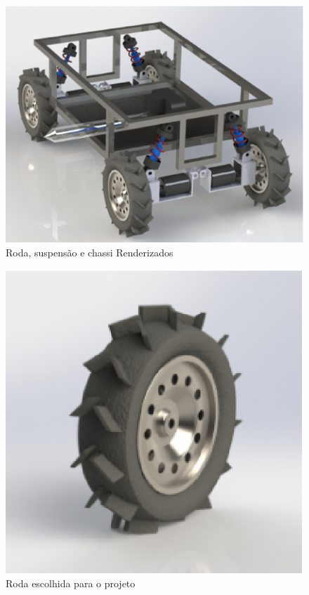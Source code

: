   \begin{figure}[!htbp]
  \begin{center}
  \includegraphics[keepaspectratio=true,scale=0.5]{figuras/suspention02.eps}
  \caption{\label{SUSPENTION02}Roda, suspensão e chassi Renderizados}
  \end{center}
  \end{figure}

  \begin{figure}[!htbp]
  \begin{center}
  \includegraphics[keepaspectratio=true,scale=0.8]{figuras/wheel.eps}
  \caption{\label{WHEEL}Roda escolhida para o projeto}
  \end{center}
  \end{figure}

